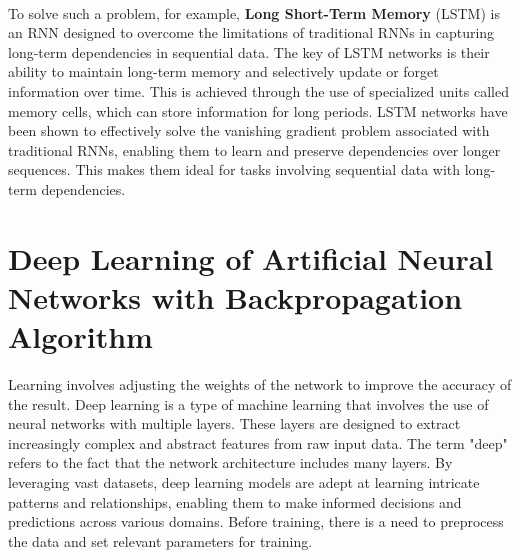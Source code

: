 \documentclass[english,version-2022-01]{uzl-thesis}
\begin{document}
\begin{itemize}
    \\
    To solve such a problem, for example, \textbf{Long Short-Term Memory} (LSTM) is an RNN designed to overcome the limitations of traditional RNNs in capturing long-term dependencies in sequential data. The key of LSTM networks is their ability to maintain long-term memory and selectively update or forget information over time. This is achieved through the use of specialized units called memory cells, which can store information for long periods. LSTM networks have been shown to effectively solve the vanishing gradient problem associated with traditional RNNs, enabling them to learn and preserve dependencies over longer sequences. This makes them ideal for tasks involving sequential data with long-term dependencies.\cite{LongShort-termMemory}
\end{itemize}
\section{Deep Learning of Artificial Neural Networks with Backpropagation Algorithm}\label{Deep Learning} Learning involves adjusting the weights of the network to improve the accuracy of the result. Deep learning is a type of machine learning that involves the use of neural networks with multiple layers. These layers are designed to extract increasingly complex and abstract features from raw input data. The term "deep" refers to the fact that the network architecture includes many layers. By leveraging vast datasets, deep learning models are adept at learning intricate patterns and relationships, enabling them to make informed decisions and predictions across various domains. Before training, there is a need to preprocess the data and set relevant parameters for training.
\end{document}
